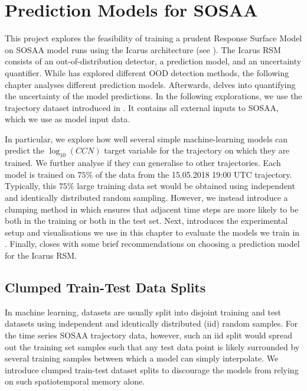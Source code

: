 \chapter{Prediction Models for SOSAA} \label{txt:prediction-chapter}

This project explores the feasibility of training a prudent Response Surface Model on SOSAA model runs using the Icarus architecture (see ). The Icarus RSM consists of an out-of-distribution detector, a prediction model, and an uncertainty quantifier. While  has explored different OOD detection methods, the following chapter analyses different prediction models. Afterwards,  delves into quantifying the uncertainty of the model predictions. In the following explorations, we use the trajectory dataset introduced in . It contains all external inputs to SOSAA, which we use as model input data.

In particular, we explore how well several simple machine-learning models can predict the $\log_{10}(CCN)$ target variable for the trajectory on which they are trained. We further analyse if they can generalise to other trajectories. Each model is trained on $75\%$ of the data from the 15.05.2018 19:00 UTC trajectory. Typically, this $75\%$ large training data set would be obtained using independent and identically distributed random sampling. However, we instead introduce a clumping method in  which ensures that adjacent time steps are more likely to be both in the training or both in the test set. Next,  introduces the experimental setup and visualisations we use in this chapter to evaluate the models we train in . Finally,  closes with some brief recommendations on choosing a prediction model for the Icarus RSM.

\section{Clumped Train-Test Data Splits} \label{txt:clumped-train-test-split}

In machine learning, datasets are usually split into disjoint training and test datasets using independent and identically distributed (iid) random samples. For the time series SOSAA trajectory data, however, such an iid split would spread out the training set samples such that any test data point is likely surrounded by several training samples between which a model can simply interpolate. We introduce clumped train-test dataset splits to discourage the models from relying on such spatiotemporal memory alone.

